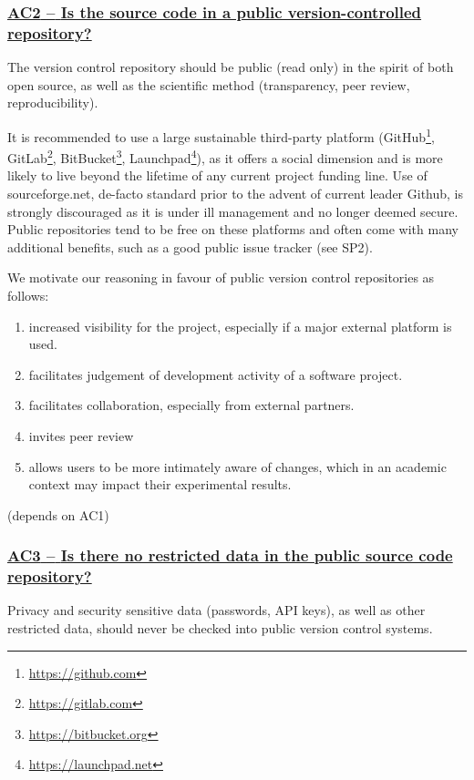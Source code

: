 \documentclass[a4paper,11pt]{article}
\newcommand{\indicator}[1]{\subsubsection*{\underline{#1}}}
\begin{document}
\newcommand{\acTwoName}{AC2}
\newcommand{\acTwoID}{\acTwoName}
\newcommand{\acTwoText}{Is the source code in a public version-controlled repository?}
\indicator{\acTwoName{ }--{ }\acTwoText}\label{id:ac2} 

The version control repository should be public (read only) in the spirit of both open
source, as well as the scientific method (transparency, peer review,
reproducibility). 

It is recommended to use a large sustainable third-party platform
(GitHub\footnote{\url{https://github.com}},
GitLab\footnote{\url{https://gitlab.com}},
BitBucket\footnote{\url{https://bitbucket.org}},
Launchpad\footnote{\url{https://launchpad.net}}), as it offers a social
dimension and is more likely to live beyond the lifetime of any current project
funding line. Use of sourceforge.net, de-facto standard prior to the advent of
current leader Github, is strongly discouraged as it is under ill management
and no longer deemed secure. Public repositories tend to be free on these platforms and
often come with many additional benefits, such as a good public issue tracker
(see SP2).

We motivate our reasoning in favour of public version control repositories as follows:

\begin{enumerate}
    \item increased visibility for the project, especially if a major external platform is used.
    \item facilitates judgement of development activity of a software project.
    \item facilitates collaboration, especially from external partners.
    \item invites peer review
    \item allows users to be more intimately aware of changes, which in an
        academic context may impact their experimental results.
\end{enumerate}

(depends on AC1)

\newcommand{\acThreeName}{AC3}
\newcommand{\acThreeID}{\acThreeName}
\newcommand{\acThreeText}{Is there no restricted data in the public source code repository?}
\indicator{\acThreeName{ }--{ }\acThreeText}\label{id:ac3} 

Privacy and security sensitive data (passwords, API keys), as well as other
restricted data, should never be checked into public version control systems.
\end{document}
